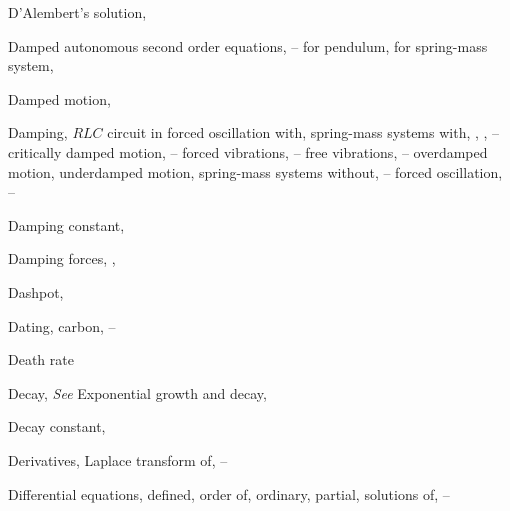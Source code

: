 \begin{theindex}
  \item D'Alembert's solution, \pageref{example:12.2.1}

  \item Damped autonomous second order equations, \pageref{eq:4.4.24}--\pageref{eq:4.5.1}
    \subitem for pendulum, \pageref{example:4.4.5}
    \subitem for spring-mass system, \pageref{eq:4.4.26}

  \item Damped motion, \pageref{eq:6.1.1}

  \item Damping,
    \subitem $RLC$ circuit in forced oscillation with, \pageref{eq:6.3.17}
    \subitem spring-mass systems with, \pageref{eq:4.4.26}, \pageref{eq:6.1.1}, \pageref{eq:6.2.1}--\pageref{exer:6.2.25}
      \subsubitem critically damped motion, \pageref{example:6.2.1}--\pageref{eq:6.2.11}
      \subsubitem forced vibrations, \pageref{eq:6.2.11}--\pageref{exer:6.2.1}
      \subsubitem free vibrations, \pageref{eq:6.2.1}--\pageref{eq:6.2.11}
      \subsubitem overdamped motion,\pageref{eq:6.2.3}
      \subsubitem underdamped motion, \pageref{eq:6.2.3}
    \subitem spring-mass systems without, \pageref{example:6.1.1}--\pageref{exer:6.1.1}
      \subsubitem forced oscillation, \pageref{eq:6.1.13}--\pageref{exer:6.1.1}

  \item Damping constant, \pageref{eq:4.4.26}

  \item Damping forces, \pageref{eq:4.4.6}, \pageref{eq:6.1.1}

  \item Dashpot, \pageref{eq:6.1.1}

  \item Dating, carbon, \pageref{eq:4.1.12}--\pageref{example:4.1.6}

  \item Death rate \pageref{eq:1.1.3}

  \item Decay, \emph{See} Exponential growth and decay,

  \item Decay constant, \pageref{eq:4.1.3}

  \item Derivatives, Laplace transform of, \pageref{thmtype:8.3.1}--\pageref{thmtype:8.3.2}

  \item Differential equations,
    \subitem defined, \pageref{eq:1.2.1}
    \subitem order of, \pageref{eq:1.2.2}
    \subitem ordinary, \pageref{eq:1.2.1}
    \subitem partial, \pageref{eq:1.2.1}
    \subitem solutions of, \pageref{example:1.2.1}--\pageref{example:1.2.5}


\end{theindex}
